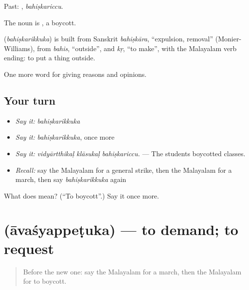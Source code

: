 Past: , \emph{bahiṣkariccu}.

The noun is , a boycott.

\begin{cousinweb}
\textbf{} (\emph{bahiṣkarikkuka}) is built from Sanskrit \emph{bahiṣkāra}, \textquotedblleft{}expulsion, removal\textquotedblright{} (Monier-Williams), from \emph{bahis}, \textquotedblleft{}outside\textquotedblright{}, and \emph{kṛ}, \textquotedblleft{}to make\textquotedblright{}, with the Malayalam verb ending: to put a thing outside.
\end{cousinweb}

\begin{grammarlens}[title={What you've built}]
One more word for giving reasons and opinions.
\end{grammarlens}

\subsection*{Your turn}
\begin{itemize}
\raggedright
  \item \emph{Say it:} \emph{bahiṣkarikkuka}
  \item \emph{Say it:} \emph{bahiṣkarikkuka}, once more
  \item \emph{Say it:} \emph{vidyārtthikaḷ klāsukaḷ bahiṣkariccu.} — The students boycotted classes.
  \item \emph{Recall:} say the Malayalam for a general strike, then the Malayalam for a march, then say \emph{bahiṣkarikkuka} again
\end{itemize}

\begin{tcolorbox}[breakable,colback=teal!4,colframe=teal!35!black,title={Before you move on}]
What does  mean? (\textquotedblleft{}To boycott\textquotedblright{}.) Say it once more.
\end{tcolorbox}
\section[\texorpdfstring{\ml{ആവശ്യപ്പെടുക} (āvaśyappeṭuka)}{ആവശ്യപ്പെടുക (āvaśyappeṭuka)}]{ (āvaśyappeṭuka) — to demand; to request}

\label{lesson:ML-C426-avasyappetuka}



\begin{quote}
Before the new one: say the Malayalam for a march, then the Malayalam for to boycott.
\end{quote}

